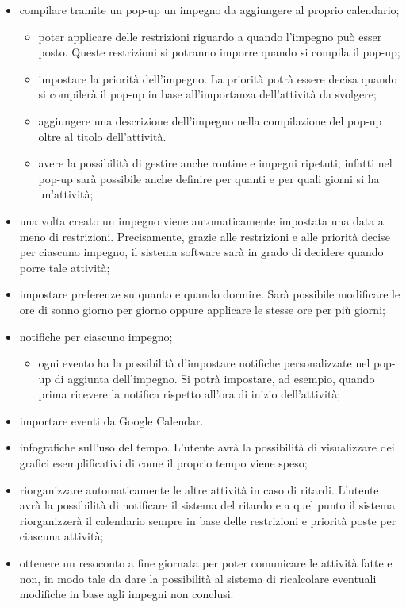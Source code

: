 \begin{itemize}
    \item compilare tramite un pop-up un impegno da aggiungere al proprio calendario;
          \begin{itemize}
              \item poter applicare delle restrizioni riguardo a quando l'impegno può esser posto. Queste
                    restrizioni si potranno imporre quando si compila il pop-up;
              \item impostare la priorità dell'impegno. La priorità potrà essere decisa quando si compilerà il pop-up in base all'importanza dell'attività da svolgere;
              \item aggiungere una descrizione dell'impegno nella compilazione del pop-up oltre al titolo dell'attività.
              \item avere la possibilità di gestire anche routine e impegni ripetuti; infatti nel pop-up sarà possibile anche definire per quanti e per quali giorni si ha un'attività;
          \end{itemize}
    \item una volta creato un impegno viene automaticamente impostata una data a meno di restrizioni. Precisamente, grazie alle restrizioni e alle priorità decise per ciascuno
          impegno, il sistema software sarà in grado di decidere quando porre tale attività;
    \item impostare preferenze su quanto e quando dormire. Sarà possibile modificare le ore di sonno giorno per giorno oppure
          applicare le stesse ore per più giorni;
    \item notifiche per ciascuno impegno;
          \begin{itemize}
              \item ogni evento ha la possibilità d'impostare notifiche personalizzate nel pop-up di aggiunta dell'impegno. Si potrà impostare, ad esempio, quando prima ricevere la notifica rispetto all'ora di inizio dell'attività;
          \end{itemize}
    \item importare eventi da Google Calendar.
    \item infografiche sull'uso del tempo. L'utente avrà la possibilità di visualizzare dei grafici esemplificativi di come il proprio
          tempo viene speso;
    \item riorganizzare automaticamente le altre attività in caso di ritardi. L'utente avrà la possibilità di notificare il sistema del ritardo e
          a quel punto il sistema riorganizzerà il calendario sempre in base delle restrizioni e priorità poste per ciascuna attività;
    \item ottenere un resoconto a fine giornata per poter comunicare le attività fatte e non, in modo tale da dare la possibilità al sistema di ricalcolare eventuali modifiche in base agli impegni non conclusi.
\end{itemize}

